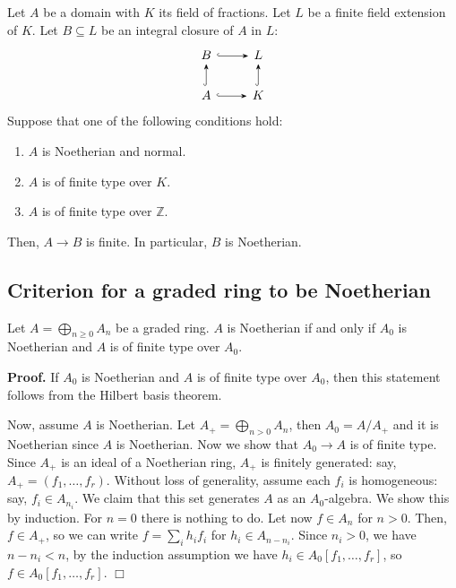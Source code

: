 \documentclass{template}
\newcommand{\qedwhite}{\hfill \ensuremath{\Box}}
\begin{document}
\begin{theorem}
    Let $A$ be a domain with $K$ its field of fractions. Let $L$ be a
    finite field extension of $K$. Let $B \subseteq L$ be an integral closure 
    of $A$ in $L$:
    \[
    \begin{tikzcd}
        B \arrow[-Stealth, hook]{r}{} & L \\
        A \arrow[-Stealth, hook]{u}{} \arrow[-Stealth, hook]{r}{} & K \arrow[-Stealth, hook]{u}{}
    \end{tikzcd}
    \]
    Suppose that one of the following conditions hold:
    \begin{enumerate}
        \item[(a)] $A$ is Noetherian and normal.
        \item[(b)] $A$ is of finite type over $K$.
        \item[(c)] $A$ is of finite type over $\mathbb{Z}$.
    \end{enumerate}
    Then, $A \to B$ is finite. In particular, $B$ is Noetherian.
\end{theorem}

\subsection{Criterion for a graded ring to be Noetherian}

\begin{proposition}
    Let $A = \bigoplus_{n\geq 0} A_n$ be a graded ring. $A$ is Noetherian if and only if
    $A_0$ is Noetherian and $A$ is of finite type over $A_0$.
\end{proposition}

\textbf{Proof.} If $A_0$ is Noetherian and $A$ is of finite type over $A_0$,
then this statement follows from the Hilbert basis theorem.

Now, assume $A$ is Noetherian. Let $A_+ = \bigoplus_{n>0}A_n$, then $A_0 =
A/A_+$ and it is Noetherian since $A$ is Noetherian. Now we show that $A_0 \to
A$ is of finite type. Since $A_+$ is an ideal of a Noetherian ring, $A_+$ is
finitely generated: say, $A_+=(f_1,\dots,f_r)$. Without loss of generality,
assume each $f_i$ is homogeneous: say, $f_i \in A_{n_i}$. We claim that this set
generates $A$ as an $A_0$-algebra. We show this by induction. For $n=0$ there is
nothing to do. Let now $f \in A_n$ for $n>0$. Then, $f \in A_+$, so we can write
$f=\sum_i h_if_i$ for $h_i \in A_{n-n_i}$. Since $n_i>0$, we have $n-n_i<n$, by
the induction assumption we have $h_i \in A_0[f_1,\dots,f_r]$, so $f \in
A_0[f_1,\dots,f_r]$. \qedwhite
\end{document}
